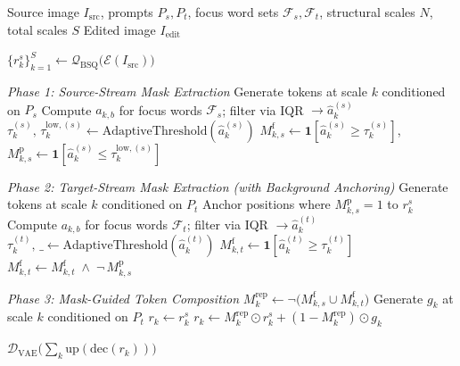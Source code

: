\begin{algorithm}[t]
\caption{Three-Phase Attention-Masked Editing}
\label{alg:editing}
\small
\begin{algorithmic}[1]
\Require Source image $I_{\mathrm{src}}$, prompts $P_s, P_t$, focus word sets $\mathcal{F}_s, \mathcal{F}_t$,
         structural scales $N$, total scales $S$
\Ensure Edited image $I_{\mathrm{edit}}$

\State $\{r_k^s\}_{k=1}^{S} \gets \mathcal{Q}_{\mathrm{BSQ}}\!\bigl(\mathcal{E}(I_{\mathrm{src}})\bigr)$


    \Statex \textit{\quad Phase 1: Source-Stream Mask Extraction}
    \State Generate tokens at scale $k$ conditioned on $P_s$
        \State Compute $a_{k,b}$ for focus words $\mathcal{F}_s$; filter via IQR $\to \hat{a}_k^{(s)}$
        \State $\tau_k^{(s)},\, \tau_k^{\mathrm{low},(s)} \gets \mathrm{AdaptiveThreshold}(\hat{a}_k^{(s)})$ 
        \State $M_{k,s}^{\mathrm{f}} \gets \mathbf{1}[\hat{a}_k^{(s)} \ge \tau_k^{(s)}]$,\quad
               $M_{k,s}^{\mathrm{p}} \gets \mathbf{1}[\hat{a}_k^{(s)} \le \tau_k^{\mathrm{low},(s)}]$
    \EndIf

    \Statex \textit{\quad Phase 2: Target-Stream Mask Extraction (with Background Anchoring)}
    \State Generate tokens at scale $k$ conditioned on $P_t$
        \State Anchor positions where $M_{k,s}^{\mathrm{p}}{=}1$ to $r_k^s$ 
        \State Compute $a_{k,b}$ for focus words $\mathcal{F}_t$; filter via IQR $\to \hat{a}_k^{(t)}$
        \State $\tau_k^{(t)},\, \_ \gets \mathrm{AdaptiveThreshold}(\hat{a}_k^{(t)})$
        \State $M_{k,t}^{\mathrm{f}} \gets \mathbf{1}[\hat{a}_k^{(t)} \ge \tau_k^{(t)}]$
        \State $M_{k,t}^{\mathrm{f}} \gets M_{k,t}^{\mathrm{f}} \;\wedge\; \neg\, M_{k,s}^{\mathrm{p}}$ 
    \EndIf

    \Statex \textit{\quad Phase 3: Mask-Guided Token Composition}
    \State $M_k^{\mathrm{rep}} \gets \neg\!\bigl(M_{k,s}^{\mathrm{f}} \cup M_{k,t}^{\mathrm{f}}\bigr)$
    \State Generate $g_k$ at scale $k$ conditioned on $P_t$
        \State $r_k \gets r_k^s$ 
    \Else
        \State $r_k \gets M_k^{\mathrm{rep}} \odot r_k^s + (1{-}M_k^{\mathrm{rep}}) \odot g_k$
    \EndIf

\EndFor

\State \Return $\mathcal{D}_{\mathrm{VAE}}\!\bigl(\textstyle\sum_{k} \mathrm{up}(\mathrm{dec}(r_k))\bigr)$
\end{algorithmic}
\end{algorithm}
